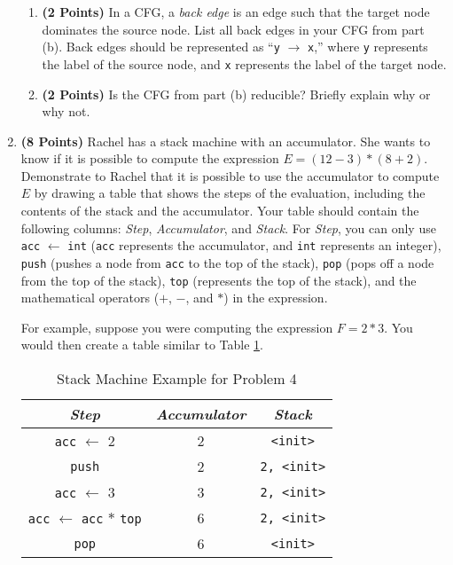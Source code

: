 \documentclass{article}[12pt]
\begin{document}
\begin{enumerate}
\begin{enumerate}
        \item \textbf{(2 Points)} In a CFG, a \textit{back edge} is an edge such that the target node dominates the source node. List all back edges in your CFG from part (b). Back edges should be represented as ``\texttt{y} $\rightarrow$ \texttt{x},'' where \texttt{y} represents the label of the source node, and \texttt{x} represents the label of the target node. 
        \item \textbf{(2 Points)} Is the CFG from part (b) reducible? Briefly explain why or why not.
    \end{enumerate}
    \pagebreak
    
    \item \textbf{(8 Points)} Rachel has a stack machine with an accumulator. She wants to know if it is possible to compute the expression $E = (12 - 3) * (8 + 2)$. Demonstrate to Rachel that it is possible to use the accumulator to compute $E$ by drawing a table that shows the steps of the evaluation, including the contents of the stack and the accumulator. Your table should contain the following columns: \textit{Step}, \textit{Accumulator}, and \textit{Stack}. For \textit{Step}, you can only use \texttt{acc} $\leftarrow$ \texttt{int} (\texttt{acc} represents the accumulator, and \texttt{int} represents an integer), \texttt{push} (pushes a node from \texttt{acc} to the top of the stack), \texttt{pop} (pops off a node from the top of the stack), \texttt{top} (represents the top of the stack), and the mathematical operators ($+$, $-$, and $*$) in the expression.
    
    For example, suppose you were computing the expression $F = 2 * 3$. You would then create a table similar to Table \ref{sm}.
    
    \begin{table}[t]
        \caption{Stack Machine Example for Problem 4}
        \label{sm}
        \centering
        \begin{tabular}{|c|c|c|}
            \toprule
            \textit{Step} & \textit{Accumulator} & \textit{Stack}\\
            \midrule
            \texttt{acc} $\leftarrow$ 2 & 2 & \texttt{<init>}\\
            \texttt{push} & 2 & \texttt{2, <init>}\\
            \texttt{acc} $\leftarrow$ 3 & 3 & \texttt{2, <init>}\\
            \texttt{acc} $\leftarrow$ \texttt{acc} $*$ \texttt{top} & 6 & \texttt{2, <init>}\\
            \texttt{pop} & 6 & \texttt{<init>}\\
            \bottomrule
    \end{tabular}
\end{table}
    
\end{enumerate}
\end{document}

